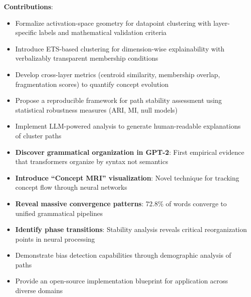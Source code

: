 \textbf{Contributions}:
\begin{itemize}
    \item Formalize activation-space geometry for datapoint clustering with layer-specific labels and mathematical validation criteria
    \item Introduce ETS-based clustering for dimension-wise explainability with verbalizably transparent membership conditions
    \item Develop cross-layer metrics (centroid similarity, membership overlap, fragmentation scores) to quantify concept evolution
    \item Propose a reproducible framework for path stability assessment using statistical robustness measures (ARI, MI, null models)
    \item Implement LLM-powered analysis to generate human-readable explanations of cluster paths
    \item \textbf{Discover grammatical organization in GPT-2}: First empirical evidence that transformers organize by syntax not semantics
    \item \textbf{Introduce ``Concept MRI'' visualization}: Novel technique for tracking concept flow through neural networks
    \item \textbf{Reveal massive convergence patterns}: 72.8\% of words converge to unified grammatical pipelines
    \item \textbf{Identify phase transitions}: Stability analysis reveals critical reorganization points in neural processing
    \item Demonstrate bias detection capabilities through demographic analysis of paths
    \item Provide an open-source implementation blueprint for application across diverse domains
\end{itemize}